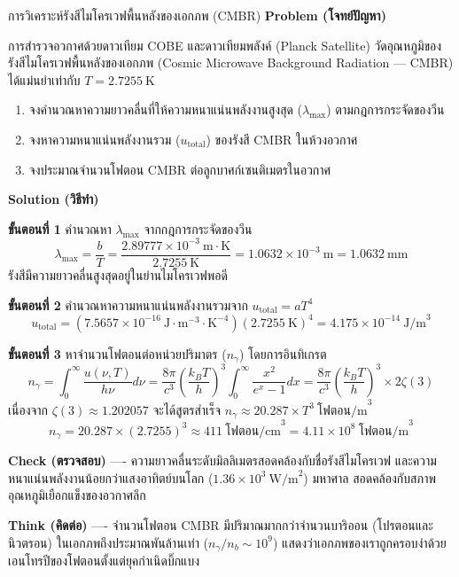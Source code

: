 \begin{psctbox}{การวิเคราะห์รังสีไมโครเวฟพื้นหลังของเอกภพ (CMBR)}
\textbf{Problem (โจทย์ปัญหา)}

การสำรวจอวกาศด้วยดาวเทียม COBE และดาวเทียมพลังค์ (Planck Satellite) วัดอุณหภูมิของรังสีไมโครเวฟพื้นหลังของเอกภพ (Cosmic Microwave Background Radiation --- CMBR) ได้แม่นยำเท่ากับ $T = 2.7255~\text{K}$
\begin{enumerate}
    \item จงคำนวณหาความยาวคลื่นที่ให้ความหนาแน่นพลังงานสูงสุด ($\lambda_{\max}$) ตามกฎการกระจัดของวีน
    \item จงหาความหนาแน่นพลังงานรวม ($u_{\text{total}}$) ของรังสี CMBR ในห้วงอวกาศ
    \item จงประมาณจำนวนโฟตอน CMBR ต่อลูกบาศก์เซนติเมตรในอวกาศ
\end{enumerate}

\textbf{Solution (วิธีทำ)}

\textbf{ขั้นตอนที่ 1} คำนวณหา $\lambda_{\max}$ จากกฎการกระจัดของวีน
\begin{equation*}
\lambda_{\max} = \frac{b}{T} = \frac{2.89777 \times 10^{-3}~\text{m}\cdot\text{K}}{2.7255~\text{K}} = 1.0632 \times 10^{-3}~\text{m} = 1.0632~\text{mm}
\end{equation*}
รังสีมีความยาวคลื่นสูงสุดอยู่ในย่านไมโครเวฟพอดี

\textbf{ขั้นตอนที่ 2} คำนวณหาความหนาแน่นพลังงานรวมจาก $u_{\text{total}} = a T^4$
\begin{equation*}
u_{\text{total}} = (7.5657 \times 10^{-16}~\text{J}\cdot\text{m}^{-3}\cdot\text{K}^{-4})(2.7255~\text{K})^4 = 4.175 \times 10^{-14}~\text{J/m}^3
\end{equation*}

\textbf{ขั้นตอนที่ 3} หาจำนวนโฟตอนต่อหน่วยปริมาตร ($n_\gamma$) โดยการอินทิเกรต
\begin{equation*}
n_\gamma = \int_0^\infty \frac{u(\nu, T)}{h\nu} d\nu = \frac{8\pi}{c^3}\left( \frac{k_B T}{h} \right)^3 \int_0^\infty \frac{x^2}{e^x - 1} dx = \frac{8\pi}{c^3}\left( \frac{k_B T}{h} \right)^3 \times 2\zeta(3)
\end{equation*}
เนื่องจาก $\zeta(3) \approx 1.202057$ จะได้สูตรสำเร็จ $n_\gamma \approx 20.287 \times T^3~\text{โฟตอน/m}^3$
\begin{equation*}
n_\gamma = 20.287 \times (2.7255)^3 \approx 411~\text{โฟตอน/cm}^3 = 4.11 \times 10^8~\text{โฟตอน/m}^3
\end{equation*}

\textbf{Check (ตรวจสอบ)} ---- ความยาวคลื่นระดับมิลลิเมตรสอดคล้องกับชื่อรังสีไมโครเวฟ และความหนาแน่นพลังงานน้อยกว่าแสงอาทิตย์บนโลก ($1.36 \times 10^3~\text{W/m}^2$) มหาศาล สอดคล้องกับสภาพอุณหภูมิเยือกแข็งของอวกาศลึก

\textbf{Think (คิดต่อ)} ---- จำนวนโฟตอน CMBR มีปริมาณมากกว่าจำนวนบาริออน (โปรตอนและนิวตรอน) ในเอกภพถึงประมาณพันล้านเท่า ($n_\gamma / n_b \sim 10^9$) แสดงว่าเอกภพของเราถูกครอบงำด้วยเอนโทรปีของโฟตอนตั้งแต่ยุคกำเนิดบิ๊กแบง
\end{psctbox}


